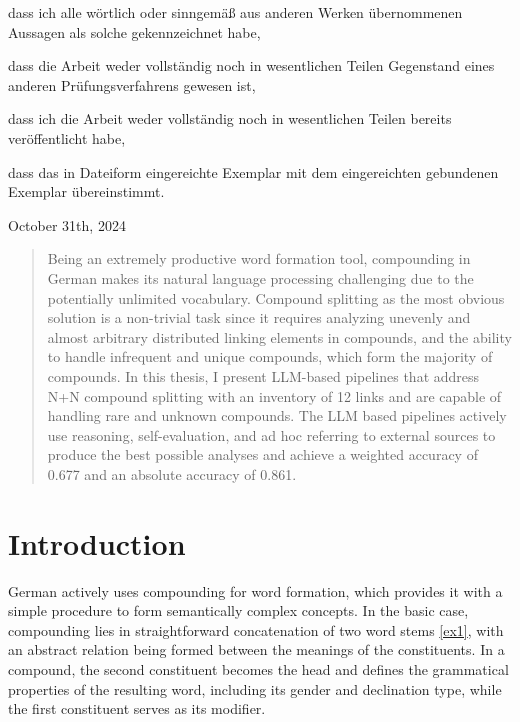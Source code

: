 \documentclass[11pt]{article}
\begin{document}
\begin{titlepage}
\begin{flushleft}
{            dass ich alle wörtlich oder sinngemäß aus anderen Werken übernommenen Aussagen als solche gekennzeichnet habe,
            
            dass die Arbeit weder vollständig noch in wesentlichen Teilen Gegenstand eines anderen Prüfungsverfahrens gewesen ist,
            
            dass ich die Arbeit weder vollständig noch in wesentlichen Teilen bereits veröffentlicht habe,
            
            dass das in Dateiform eingereichte Exemplar mit dem eingereichten gebundenen Exemplar übereinstimmt.
        }
        
    \vfill

    October 31th, 2024

    \vspace{3cm}
    
    \end{flushleft}

\end{titlepage}



\begin{abstract}

Being an extremely productive word formation tool, compounding in German makes its natural language processing challenging due to the potentially unlimited vocabulary. Compound splitting as the most obvious solution is a non-trivial task since it requires analyzing unevenly and almost arbitrary distributed linking elements in compounds, and the ability to handle infrequent and unique compounds, which form the majority of compounds. In this thesis, I present LLM-based pipelines that address N+N compound splitting with an inventory of 12 links and are capable of handling rare and unknown compounds. The LLM based pipelines actively use reasoning, self-evaluation, and ad hoc referring to external sources to produce the best possible analyses and achieve a weighted accuracy of 0.677 and an absolute accuracy of 0.861.

\end{abstract}


\section{Introduction}
\label{sec:intro}

German actively uses compounding for word formation, which provides it with a simple procedure to form semantically complex concepts. In the basic case, compounding lies in straightforward concatenation of two word stems \ref{ex1}, with an abstract relation being formed between the meanings of the constituents. In a compound, the second constituent becomes the head and defines the grammatical properties of the resulting word, including its gender and declination type, while the first constituent serves as its modifier.
\end{document}
